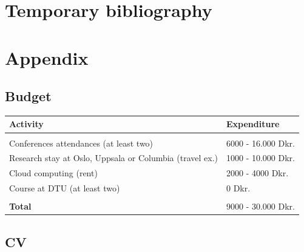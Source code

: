 \documentclass[a4paper]{article}
\begin{document}
\section{Temporary bibliography}
 


\pagebreak
\section{Appendix}

\subsection{Budget}

\begin{center}
\begin{tabular}{  m{10cm} m{4cm} } 

	\hline
	\textbf{Activity}    & \textbf{Expenditure}\\
	\hline
	    &                               \\
	Conferences attendances (at least two)   & 6000 - 16.000 Dkr.                       \\
    Research stay at Oslo, Uppsala or Columbia (travel ex.)  & 1000 - 10.000 Dkr.				\\
	Cloud computing (rent)   & 2000 - 4000 Dkr.			                                \\
    Course at DTU (at least two) & 0 Dkr.			                                \\
 	    &                               \\
 	\hline
    \textbf{Total}       & 9000 - 30.000 Dkr.			    \\
    \hline

\end{tabular}
\end{center}


\pagebreak
\subsection{CV}
\end{document}
